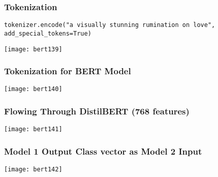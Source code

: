 \begin{frame}[fragile]\frametitle{ Tokenization}

\lstinline|tokenizer.encode("a visually stunning rumination on love", add_special_tokens=True)|


			\begin{center}
			\texttt{[image: bert139]}
			\end{center}	


\end{frame}

\begin{frame}[fragile]\frametitle{ Tokenization for BERT Model}

			\begin{center}
			\texttt{[image: bert140]}
			\end{center}	


\end{frame}

\begin{frame}[fragile]\frametitle{ Flowing Through DistilBERT (768 features)}

			\begin{center}
			\texttt{[image: bert141]}
			\end{center}	


\end{frame}

\begin{frame}[fragile]\frametitle{ Model 1 Output Class vector as Model 2 Input}

			\begin{center}
			\texttt{[image: bert142]}
			\end{center}	


\end{frame}

